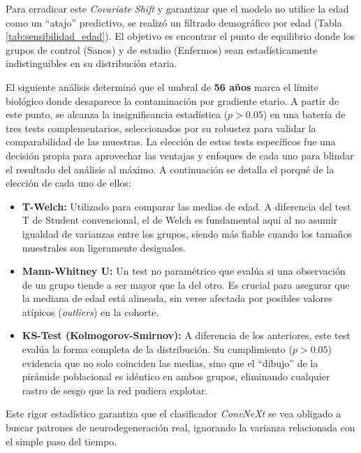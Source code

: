 \documentclass[12pt, oneside, english, spanish]{book}
\begin{document}
Para erradicar este \textit{Covariate Shift} y garantizar que el modelo no utilice la edad como un ``atajo'' predictivo, se realizó un filtrado demográfico por edad (Tabla \ref{tab:sensibilidad_edad}). El objetivo es encontrar el punto de equilibrio donde los grupos de control (Sanos) y de estudio (Enfermos) sean estadísticamente indistinguibles en su distribución etaria.

El siguiente análisis determinó que el umbral de \textbf{56 años} marca el límite biológico donde desaparece la contaminación por gradiente etario. A partir de este punto, se alcanza la insignificancia estadística ($p > 0.05$) en una batería de tres tests complementarios, seleccionados por su robustez para validar la comparabilidad de las muestras. La elección de estos tests específicos fue una decisión propia para aprovechar las ventajas y enfoques de cada uno para blindar el resultado del análisis al máximo. A continuación se detalla el porqué de la elección de cada uno de ellos:

\begin{itemize}
	\item \textbf{T-Welch:} Utilizado para comparar las medias de edad. A diferencia del test T de Student convencional, el de Welch es fundamental aquí al no asumir igualdad de varianzas entre los grupos, siendo más fiable cuando los tamaños muestrales son ligeramente desiguales.
	\item \textbf{Mann-Whitney U:} Un test no paramétrico que evalúa si una observación de un grupo tiende a ser mayor que la del otro. Es crucial para asegurar que la mediana de edad está alineada, sin verse afectada por posibles valores atípicos (\textit{outliers}) en la cohorte.
	\item \textbf{KS-Test (Kolmogorov-Smirnov):} A diferencia de los anteriores, este test evalúa la forma completa de la distribución. Su cumplimiento ($p > 0.05$) evidencia que no solo coinciden las medias, sino que el ``dibujo'' de la pirámide poblacional es idéntico en ambos grupos, eliminando cualquier rastro de sesgo que la red pudiera explotar.
\end{itemize}

Este rigor estadístico garantiza que el clasificador \textit{ConvNeXt} se vea obligado a buscar patrones de neurodegeneración real, ignorando la varianza relacionada con el simple paso del tiempo.
\end{document}
